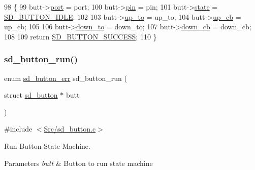 \begin{DoxyCode}
98 \{
99     butt->\mbox{\hyperlink{structsd__button_a82241972e0292c7de95ea1e293e11be3}{port}} = port;
100     butt->\mbox{\hyperlink{structsd__button_a4144813adfa4dfe7e7cbeea17d1b06eb}{pin}} = pin;
101     butt->\mbox{\hyperlink{structsd__button_ade8bc1d49a12e01bd732b12c411b9861}{state}} = \mbox{\hyperlink{group___s_d___button___types_ggad961a8af755b135c7e69a304d4f6303cacc42f7640a397b5daf63328ab9ae0d88}{SD\_BUTTON\_IDLE}};
102     
103     butt->\mbox{\hyperlink{structsd__button_a92e85c4fc2f84cfa9fbed1fd60a7fac7}{up\_to}} = up\_to;
104     butt->\mbox{\hyperlink{structsd__button_afc4472a8d74ec3156eae7b77bf8a256c}{up\_cb}} = up\_cb;
105     
106     butt->\mbox{\hyperlink{structsd__button_a3a9f2a46d68b7d2da0fafa3f2ddbdfb1}{down\_to}} = down\_to;
107     butt->\mbox{\hyperlink{structsd__button_ab831af9861aafa479d1245fb2a3633fc}{down\_cb}} = down\_cb;
108     
109     \textcolor{keywordflow}{return} \mbox{\hyperlink{group___s_d___button___types_gga93131f1a3e8fe4f740d62e8ac62685e8a4dfca3cbf0aed46511901c12ac832585}{SD\_BUTTON\_SUCCESS}};
110 \}
\end{DoxyCode}
\mbox{\label{group___s_d___button___functions_ga7a7531af5b22def563a84f74d8328aa8}} 
\subsubsection{\texorpdfstring{sd\+\_\+button\+\_\+run()}{sd\_button\_run()}}
{\footnotesize\ttfamily enum \mbox{\hyperlink{group___s_d___button___types_ga93131f1a3e8fe4f740d62e8ac62685e8}{sd\+\_\+button\+\_\+err}} sd\+\_\+button\+\_\+run (\begin{DoxyParamCaption}\item[{struct \mbox{\hyperlink{structsd__button}{sd\+\_\+button}} $\ast$}]{butt }\end{DoxyParamCaption})}



{\ttfamily \#include $<$\mbox{\hyperlink{sd__button_8c}{Src/sd\+\_\+button.\+c}}$>$}



Run Button State Machine. 


\begin{DoxyParams}{Parameters}
{\em butt} & Button to run state machine \\
\hline
\end{DoxyParams}

